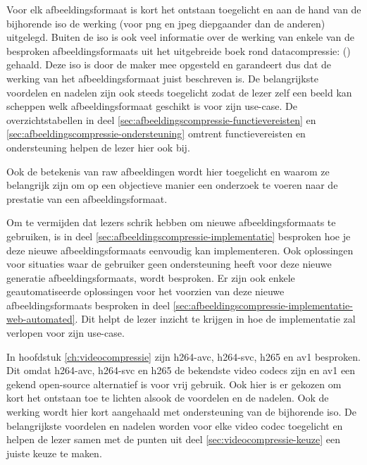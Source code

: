 Voor elk \gls{afbeeldingsformaat} is kort het ontstaan toegelicht en aan de hand van de bijhorende \gls{iso} de werking (voor \gls{png} en \gls{jpeg} diepgaander dan de anderen) uitgelegd. Buiten de \gls{iso} is ook veel informatie over de werking van enkele van de besproken \glspl{afbeeldingsformaat} uit het uitgebreide boek rond \gls{datacompressie}:  (\cite{Salomon2006}) gehaald. Deze \gls{iso} is door de maker mee opgesteld en garandeert dus dat de werking van het \gls{afbeeldingsformaat} juist beschreven is. De belangrijkste voordelen en nadelen zijn ook steeds toegelicht zodat de lezer zelf een beeld kan scheppen welk \gls{afbeeldingsformaat} geschikt is voor zijn \gls{use-case}. De overzichtstabellen in deel \ref{sec:afbeeldingscompressie-functievereisten} en \ref{sec:afbeeldingscompressie-ondersteuning} omtrent functievereisten en ondersteuning helpen de lezer hier ook bij.

Ook de betekenis van \gls{raw} afbeeldingen wordt hier toegelicht en waarom ze belangrijk zijn om op een objectieve manier een onderzoek te voeren naar de prestatie van een \gls{afbeeldingsformaat}.

Om te vermijden dat lezers schrik hebben om nieuwe \glspl{afbeeldingsformaat} te gebruiken, is in deel \ref{sec:afbeeldingscompressie-implementatie} besproken hoe je deze nieuwe \glspl{afbeeldingsformaat} eenvoudig kan implementeren. Ook oplossingen voor situaties waar de gebruiker geen ondersteuning heeft voor deze nieuwe generatie \glspl{afbeeldingsformaat}, wordt besproken. Er zijn ook enkele geautomatiseerde oplossingen voor het voorzien van deze nieuwe \glspl{afbeeldingsformaat} besproken in deel \ref{sec:afbeeldingscompressie-implementatie-web-automated}. Dit helpt de lezer inzicht te krijgen in hoe de implementatie zal verlopen voor zijn \gls{use-case}.

In hoofdstuk \ref{ch:videocompressie} zijn \gls{h264-avc}, \gls{h264-svc}, \gls{h265} en \gls{av1} besproken. Dit omdat \gls{h264-avc}, \gls{h264-svc} en \gls{h265} de bekendste video \glspl{codec} zijn en \gls{av1} een gekend \gls{open-source} alternatief is voor vrij gebruik. Ook hier is er gekozen om kort het ontstaan toe te lichten alsook de voordelen en de nadelen. Ook de werking wordt hier kort aangehaald met ondersteuning van de bijhorende \gls{iso}. De belangrijkste voordelen en nadelen worden voor elke video \gls{codec} toegelicht en helpen de lezer samen met de punten uit deel \ref{sec:videocompressie-keuze} een juiste keuze te maken.

